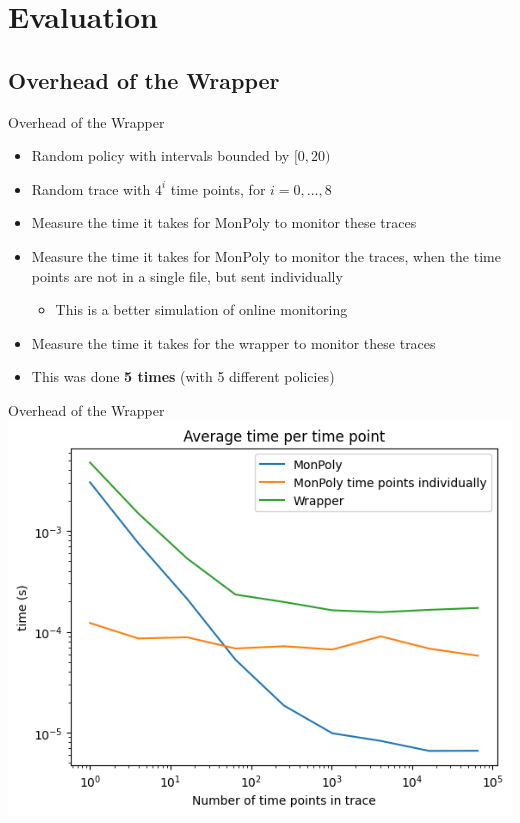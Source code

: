 \section{Evaluation}


\subsection{Overhead of the Wrapper}
\begin{frame}{Overhead of the Wrapper}
    \begin{itemize}
        \item Random policy with intervals bounded by $[0,20)$
        \item Random trace with $4^i$ time points, for $i = 0,\dots,8$
        \item Measure the time it takes for MonPoly to monitor these traces
        \item Measure the time it takes for MonPoly to monitor the traces, when the time points are not in a single file, but sent individually
        \begin{itemize}
            \item This is a better simulation of online monitoring
        \end{itemize}
        \item Measure the time it takes for the wrapper to monitor these traces
        \item This was done \textbf{5 times} (with 5 different policies)
    \end{itemize}
\end{frame}

\begin{frame}{Overhead of the Wrapper}
    \centering
    \includegraphics[width=0.9\linewidth]{diagrams/per-time-point-monpoly-vs-wrapper.png}
\end{frame}

